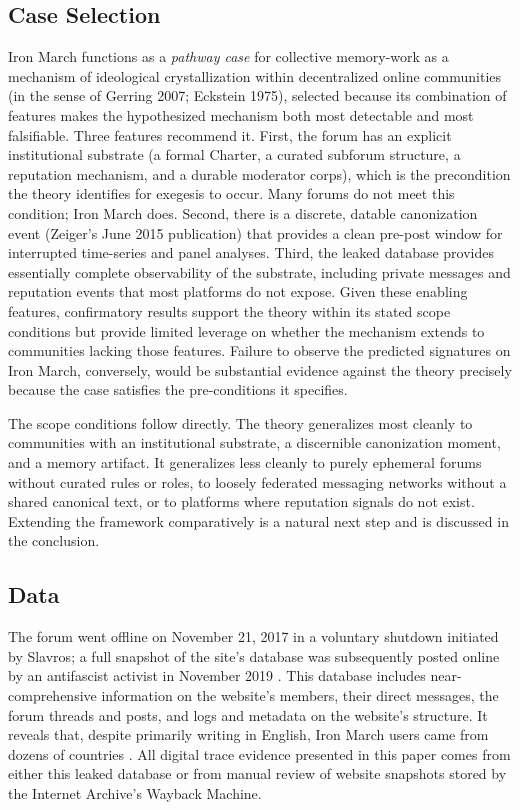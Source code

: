 \documentclass[bibtex,autowc,nonblind]{apsr_submission}
\begin{document}
\subsection{Case Selection}

Iron March functions as a \textit{pathway case} for collective memory-work as a mechanism of ideological crystallization within decentralized online communities (in the sense of Gerring 2007; Eckstein 1975), selected because its combination of features makes the hypothesized mechanism both most detectable and most falsifiable. Three features recommend it. First, the forum has an explicit institutional substrate (a formal Charter, a curated subforum structure, a reputation mechanism, and a durable moderator corps), which is the precondition the theory identifies for exegesis to occur. Many forums do not meet this condition; Iron March does. Second, there is a discrete, datable canonization event (Zeiger's June 2015 publication) that provides a clean pre-post window for interrupted time-series and panel analyses. Third, the leaked database provides essentially complete observability of the substrate, including private messages and reputation events that most platforms do not expose. Given these enabling features, confirmatory results support the theory within its stated scope conditions but provide limited leverage on whether the mechanism extends to communities lacking those features. Failure to observe the predicted signatures on Iron March, conversely, would be substantial evidence against the theory precisely because the case satisfies the pre-conditions it specifies.

The scope conditions follow directly. The theory generalizes most cleanly to communities with an institutional substrate, a discernible canonization moment, and a memory artifact. It generalizes less cleanly to purely ephemeral forums without curated rules or roles, to loosely federated messaging networks without a shared canonical text, or to platforms where reputation signals do not exist. Extending the framework comparatively is a natural next step and is discussed in the conclusion.

\subsection{Data}

The forum went offline on November 21, 2017 in a voluntary shutdown initiated by Slavros; a full snapshot of the site's database was subsequently posted online by an antifascist activist in November 2019 \citep{singer2020iron}. This database includes near-comprehensive information on the website's members, their direct messages, the forum threads and posts, and logs and metadata on the website's structure. It reveals that, despite primarily writing in English, Iron March users came from dozens of countries \citep{upchurch, singer2020iron, ross2019transnational}. All digital trace evidence presented in this paper comes from either this leaked database or from manual review of website snapshots stored by the Internet Archive's Wayback Machine.
\end{document}
